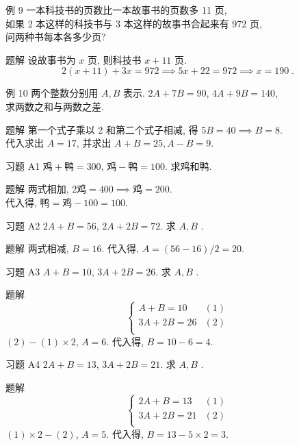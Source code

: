 \documentclass[content.tex]{subfiles}
\begin{document}
\begin{frame}{例 9}
一本科技书的页数比一本故事书的页数多 11 页, \\
如果 2 本这样的科技书与 3 本这样的故事书合起来有 972 页, \\
问两种书每本各多少页?
\begin{exampleblock}{题解}
设故事书为 $x$ 页, 则科技书 $x+11$ 页.
$$2(x+11)+3x=972\implies 5x+22=972 \implies x=190\;.$$
\end{exampleblock}
\end{frame}

\begin{frame}{例 10}
两个整数分别用 $A, B$ 表示. $2A+7B=90$, $4A+9B=140$, \\ 求两数之和与两数之差.
\begin{exampleblock}{题解}
第一个式子乘以 $2$ 和第二个式子相减, 得 $5B=40\implies B=8$.\\
代入求出 $A=17$, 并求出 $A+B=25, A-B=9.$
\end{exampleblock}
\end{frame}

\begin{frame}{习题 A1}
$\text{鸡}+\text{鸭}=300$, $\text{鸡}-\text{鸭}=100$. 求鸡和鸭.
\begin{exampleblock}{题解}
两式相加, $2\text{鸡} = 400\implies \text{鸡} = 200$. \\
代入得, $\text{鸭} = \text{鸡} - 100 = 100$.
\end{exampleblock}
\end{frame}

\begin{frame}{习题 A2}
$2A+B=56$, $2A+2B=72$. 求 $A, B$ .
\begin{exampleblock}{题解}
两式相减, $B=16$. 代入得, $A=(56-16)/2=20$.
\end{exampleblock}
\end{frame}

\begin{frame}{习题 A3}
$A+B=10$, $3A+2B=26$. 求 $A, B$ .
\begin{exampleblock}{题解}
$$
\begin{cases}
A+B=10 & (1) \\
3A+2B=26 & (2) \\
\end{cases}
$$
$(2) - (1) \times 2$, $A=6$. 代入得, $B=10-6=4$.
\end{exampleblock}
\end{frame}

\begin{frame}{习题 A4}
$2A+B=13$, $3A+2B=21$. 求 $A, B$ .
\begin{exampleblock}{题解}
$$
\begin{cases}
2A+B=13 & (1) \\
3A+2B=21 & (2) \\
\end{cases}
$$
$(1) \times 2 - (2)$, $A=5$. 代入得, $B=13 - 5\times 2=3$.
\end{exampleblock}
\end{frame}
\end{document}
